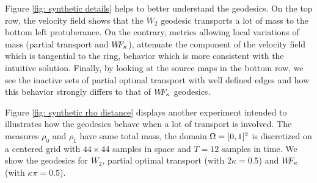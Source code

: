 Figure \ref{fig: synthetic details} helps to better understand the geodesics. On the top row, the velocity field shows that the $W_2$ geodesic transports a lot of mass to the bottom left protuberance. On the contrary, metrics allowing local variations of mass (partial transport and $W\! \! F_{\kappa}$), attenuate the component of the velocity field which is tangential to the ring, behavior which is more consistent with the intuitive solution. Finally, by looking at the source maps in the bottom row, we see the inactive sets of partial optimal transport with well defined edges and how this behavior strongly differs to that of $W\! \! F_{\kappa}$ geodesics.

Figure \ref{fig: synthetic rho distance} displays another experiment intended to illustrates how the geodesics behave when a lot of transport is involved. The measures $\rho_0$ and $\rho_1$ have same total mass, the domain $\Omega=[0,1]^2$ is discretized on a centered grid with $44 \times 44$ samples in space and $T=12$ samples in time. We show the geodesics for $W_2$, partial optimal transport (with $2\kappa=0.5$) and $W\! \! F_{\kappa}$ (with $\kappa \pi = 0.5$).


